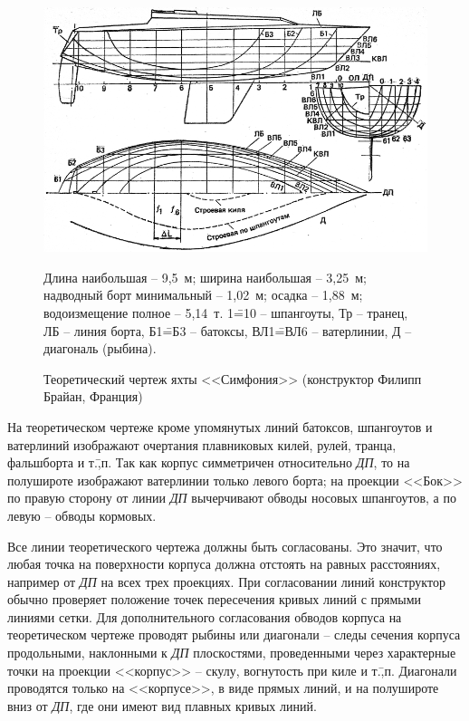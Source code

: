 \documentclass[a4paper, 12pt, twoside, final, book, russian, fittopage, cyremdash]{ncc}
\begin{document}
\begin{figure}[htb]
   \centering
   \includegraphics[scale=1.3]{0002P.pdf}
   \caption{Теоретический чертеж яхты <<Симфония>> (конструктор Филипп Брайан, Франция)}
   \label{fig:2}
   \centering{}
   \small  
   Длина наибольшая \--- 9,5~м; ширина наибольшая \--- 3,25~м; надводный борт минимальный \--- 1,02~м; осадка \--- 1,88~м; водоизмещение полное \--- 5,14~т. 1\==10 \--- шпангоуты, Тр \--- транец, ЛБ \--- линия борта, Б1\==Б3 \--- батоксы, ВЛ1\==ВЛ6 \--- ватерлинии, Д \--- диагональ (рыбина).
\end{figure}

На теоретическом чертеже кроме упомянутых линий батоксов, шпангоутов и ватерлиний изображают очертания плавниковых килей, рулей, транца, фальшборта и т.\=,п. Так как корпус симметричен относительно \textit{ДП}, то на полушироте изображают ватерлинии только левого борта; на проекции <<Бок>> по правую сторону от линии \textit{ДП} вычерчивают обводы носовых шпангоутов, а по левую \--- обводы кормовых.

Все линии теоретического чертежа должны быть согласованы. Это значит, что любая точка на поверхности корпуса должна отстоять на равных расстояниях, например от \textit{ДП} на всех трех проекциях. При согласовании линий конструктор обычно проверяет положение точек пересечения кривых линий с прямыми линиями сетки. Для дополнительного согласования обводов корпуса на теоретическом чертеже проводят рыбины или диагонали \--- следы сечения корпуса продольными, наклонными к \textit{ДП} плоскостями, проведенными через характерные точки на проекции <<корпус>> \--- скулу, вогнутость при киле и т.\=,п. Диагонали проводятся только на <<корпусе>>, в виде прямых линий, и на полушироте вниз от \textit{ДП}, где они имеют вид плавных кривых линий.
\end{document}
